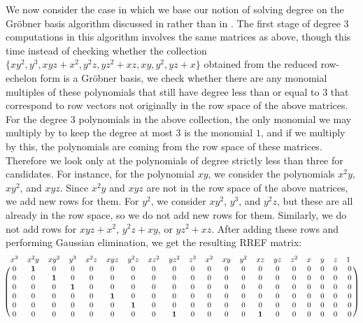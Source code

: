 \documentclass[11pt]{article}
\begin{document}
We now consider the case in which we base our notion of solving degree on the Gröbner basis algorithm discussed in \cite{caminata2023solving} rather than in \cite{caminata2020solving}. The first stage of degree 3 computations in this algorithm involves the same matrices as above, though this time instead of checking whether the collection $\{xy^2, y^3, xyz + x^2, y^2z, yz^2 + xz, xy, y^2, yz + x\}$ obtained from the reduced row-echelon form is a Gröbner basis, we check whether there are any monomial multiples of these polynomials that still have degree less than or equal to 3 that correspond to row vectors not originally in the row space of the above matrices. For the degree 3 polynomials in the above collection, the only monomial we may multiply by to keep the degree at most 3 is the monomial $1$, and if we multiply by this, the polynomials are coming from the row space of these matrices. Therefore we look only at the polynomials of degree strictly less than three for candidates. For instance, for the polynomial $xy$, we consider the polynomials $x^2y$, $xy^2$, and $xyz$. Since $x^2y$ and $xyz$ are not in the row space of the above matrices, we add new rows for them. For $y^2$, we consider $xy^2$, $y^3$, and $y^2z$, but these are all already in the row space, so we do not add new rows for them. Similarly, we do not add rows for $xyz + x^2$, $y^2z + xy$, or $yz^2 + xz$. After adding these rows and performing Gaussian elimination, we get the resulting RREF matrix: \[ \begin{blockarray}{cccccccccccccccccccc}
	x^3 & x^2y & xy^2 & y^3 & x^2z & xyz & y^2z & xz^2 & yz^2 & z^3 & x^2 & xy & y^2 & xz & yz & z^2 & x & y & z & 1\,\, \\
	\begin{block}{(cccccccccccccccccccc)}
		0 & \mathbf{1} & 0 & 0 & 0 & 0 & 0 & 0 & 0 & 0 & 0 & 0 & 0 & 0 & 0 & 0 & 0 & 0 & 0 & 0 \\
		0 & 0 & \mathbf{1} & 0 & 0 & 0 & 0 & 0 & 0 & 0 & 0 & 0 & 0 & 0 & 0 & 0 & 0 & 0 & 0 & 0 \\
		0 & 0 & 0 & \mathbf{1} & 0 & 0 & 0 & 0 & 0 & 0 & 0 & 0 & 0 & 0 & 0 & 0 & 0 & 0 & 0 & 0 \\
		0 & 0 & 0 & 0 & 0 & \mathbf{1} & 0 & 0 & 0 & 0 & 0 & 0 & 0 & 0 & 0 & 0 & 0 & 0 & 0 & 0 \\
		0 & 0 & 0 & 0 & 0 & 0 & \mathbf{1} & 0 & 0 & 0 & 0 & 0 & 0 & 0 & 0 & 0 & 0 & 0 & 0 & 0 \\
		0 & 0 & 0 & 0 & 0 & 0 & 0 & 0 & \mathbf{1} & 0 & 0 & 0 & 0 & \mathbf{1} & 0 & 0 & 0 & 0 & 0 & 0 \\

\end{block}
\end{blockarray}\]
\end{document}
